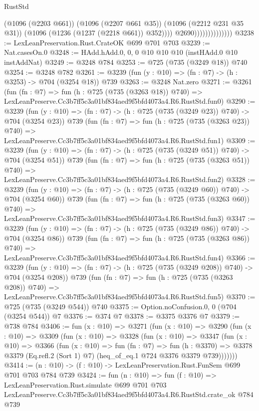 \begin{lexlean}{RustStd}
\begin{coremodule}
                                    (@1096 (@2203 @661))
                                    (@1096 (@2207 @661 @35))
                                    (@1096 (@2212 @231 @35 @31))
                                    (@1096 (@1236 (@1237 (@2218 @661)) @352))))
                                @2690))))))))))))))
@3238 := LexLeanPreservation.Rust.CrateOK @699 @701 @703
@3239 := Nat.casesOn.{0}
@3248 := HAdd.hAdd.{0, 0, 0} @10 @10 @10 (instHAdd.{0} @10 instAddNat)
@3249 := @3248 @784
@3253 := @725 (@735 (@3249 @18)) @740
@3254 := @3248 @782
@3261 := @3239 (fun (y : @10) => (fn : @7) -> (h : @3253) -> @704 (@3254 @18)) @739
@3263 := @3248 Nat.zero
@3271 := @3261
    (fun (fn : @7) =>
    fun (h : @725 (@735 (@3263 @18)) @740) =>
    LexLeanPreserve.Cc3b7ff5c3a01bf834aed9f5bfd4073a4.R6.RustStd.fun0)
@3290 := @3239
    (fun (y : @10) => (fn : @7) -> (h : @725 (@735 (@3249 @23)) @740) -> @704 (@3254 @23))
    @739
    (fun (fn : @7) =>
    fun (h : @725 (@735 (@3263 @23)) @740) =>
    LexLeanPreserve.Cc3b7ff5c3a01bf834aed9f5bfd4073a4.R6.RustStd.fun1)
@3309 := @3239
    (fun (y : @10) => (fn : @7) -> (h : @725 (@735 (@3249 @51)) @740) -> @704 (@3254 @51))
    @739
    (fun (fn : @7) =>
    fun (h : @725 (@735 (@3263 @51)) @740) =>
    LexLeanPreserve.Cc3b7ff5c3a01bf834aed9f5bfd4073a4.R6.RustStd.fun2)
@3328 := @3239
    (fun (y : @10) => (fn : @7) -> (h : @725 (@735 (@3249 @60)) @740) -> @704 (@3254 @60))
    @739
    (fun (fn : @7) =>
    fun (h : @725 (@735 (@3263 @60)) @740) =>
    LexLeanPreserve.Cc3b7ff5c3a01bf834aed9f5bfd4073a4.R6.RustStd.fun3)
@3347 := @3239
    (fun (y : @10) => (fn : @7) -> (h : @725 (@735 (@3249 @86)) @740) -> @704 (@3254 @86))
    @739
    (fun (fn : @7) =>
    fun (h : @725 (@735 (@3263 @86)) @740) =>
    LexLeanPreserve.Cc3b7ff5c3a01bf834aed9f5bfd4073a4.R6.RustStd.fun4)
@3366 := @3239
    (fun (y : @10) => (fn : @7) -> (h : @725 (@735 (@3249 @208)) @740) -> @704 (@3254 @208))
    @739
    (fun (fn : @7) =>
    fun (h : @725 (@735 (@3263 @208)) @740) =>
    LexLeanPreserve.Cc3b7ff5c3a01bf834aed9f5bfd4073a4.R6.RustStd.fun5)
@3370 := @725 (@735 (@3249 @544)) @740
@3375 := Option.noConfusion.{0, 0} (@704 (@3254 @544)) @7
@3376 := @374 @7
@3378 := @3375 @3376 @7
@3379 := @738 @784
@3406 := fun (x : @10) =>
  @3271
    (fun (x : @10) =>
    @3290
      (fun (x : @10) =>
      @3309
        (fun (x : @10) =>
        @3328
          (fun (x : @10) =>
          @3347
            (fun (x : @10) =>
            @3366
              (fun (x : @10) =>
              fun (fn : @7) =>
              fun (h : @3370) =>
              @3378 @3379 (Eq.refl.{2} (Sort 1) @7) (heq_of_eq.{1} @724 @3376 @3379 @739)))))))
@3414 := (n : @10) -> (f : @10) -> LexLeanPreservation.Rust.FunSem @699 @701 @703 @784 @739
@3424 := fun (n : @10) =>
  fun (f : @10) =>
  LexLeanPreservation.Rust.simulate
    @699
    @701
    @703
    LexLeanPreserve.Cc3b7ff5c3a01bf834aed9f5bfd4073a4.R6.RustStd.crate_ok
    @784
    @739
\end{coremodule}
\end{lexlean}

